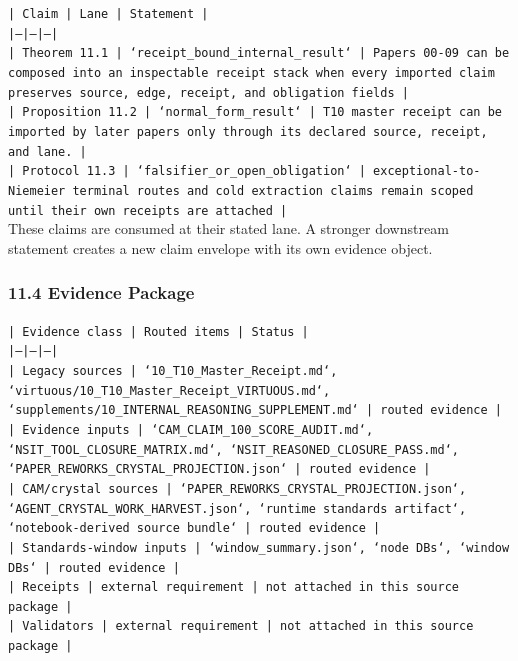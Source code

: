 \documentclass[11pt]{article}
\begin{document}
\noindent\texttt{| Claim | Lane | Statement |}\\
\noindent\texttt{|---|---|---|}\\
\noindent\texttt{| Theorem 11.1 | `receipt\_bound\_internal\_result` | Papers 00-09 can be composed into an inspectable receipt stack when every imported claim preserves source, edge, receipt, and obligation fields |}\\
\noindent\texttt{| Proposition 11.2 | `normal\_form\_result` | T10 master receipt can be imported by later papers only through its declared source, receipt, and lane. |}\\
\noindent\texttt{| Protocol 11.3 | `falsifier\_or\_open\_obligation` | exceptional-to-Niemeier terminal routes and cold extraction claims remain scoped until their own receipts are attached |}\\

These claims are consumed at their stated lane. A stronger downstream statement
creates a new claim envelope with its own evidence object.

\subsubsection*{11.4 Evidence Package}

\noindent\texttt{| Evidence class | Routed items | Status |}\\
\noindent\texttt{|---|---|---|}\\
\noindent\texttt{| Legacy sources | `10\_T10\_Master\_Receipt.md`, `virtuous/10\_T10\_Master\_Receipt\_VIRTUOUS.md`, `supplements/10\_INTERNAL\_REASONING\_SUPPLEMENT.md` | routed evidence |}\\
\noindent\texttt{| Evidence inputs | `CAM\_CLAIM\_100\_SCORE\_AUDIT.md`, `NSIT\_TOOL\_CLOSURE\_MATRIX.md`, `NSIT\_REASONED\_CLOSURE\_PASS.md`, `PAPER\_REWORKS\_CRYSTAL\_PROJECTION.json` | routed evidence |}\\
\noindent\texttt{| CAM/crystal sources | `PAPER\_REWORKS\_CRYSTAL\_PROJECTION.json`, `AGENT\_CRYSTAL\_WORK\_HARVEST.json`, `runtime standards artifact`, `notebook-derived source bundle` | routed evidence |}\\
\noindent\texttt{| Standards-window inputs | `window\_summary.json`, `node DBs`, `window DBs` | routed evidence |}\\
\noindent\texttt{| Receipts | external requirement | not attached in this source package |}\\
\noindent\texttt{| Validators | external requirement | not attached in this source package |}\\
\end{document}
